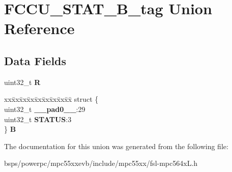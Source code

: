 \hypertarget{unionFCCU__STAT__32B__tag}{}\section{F\+C\+C\+U\+\_\+\+S\+T\+A\+T\+\_\+B\+\_\+tag Union Reference}
\label{unionFCCU__STAT__32B__tag}
\subsection*{Data Fields}
\begin{DoxyCompactItemize}
\item 
\mbox{\label{unionFCCU__STAT__32B__tag_a1d4191b4033618beaae1e56540573c6d}} 
uint32\+\_\+t {\bfseries R}
\item 
\mbox{\label{unionFCCU__STAT__32B__tag_a7a1c4d96606e6898e73b60328c6ef37e}} 
\begin{tabbing}
xx\=xx\=xx\=xx\=xx\=xx\=xx\=xx\=xx\=\kill
struct \{\\
\>uint32\_t {\bfseries \_\_pad0\_\_}:29\\
\>uint32\_t {\bfseries STATUS}:3\\
\} {\bfseries B}\\

\end{tabbing}\end{DoxyCompactItemize}


The documentation for this union was generated from the following file\+:\begin{DoxyCompactItemize}
\item 
bsps/powerpc/mpc55xxevb/include/mpc55xx/fsl-\/mpc564x\+L.\+h\end{DoxyCompactItemize}
